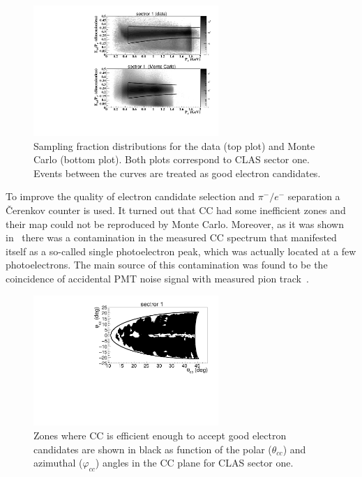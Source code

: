 \documentclass[prc,twocolumn,superscriptaddress,showpacs,amssymb,amsmath,amsfonts,linenumbers,aps]{revtex4-1}
\begin{document}
\begin{figure}[htp]
\begin{center}
 \includegraphics[width=7cm,keepaspectratio]{pictures/electron_id/ec_cut.pdf}
\vspace{-0.1cm}
\caption{Sampling fraction distributions for the data (top plot) and Monte Carlo (bottom plot). Both plots correspond to CLAS sector one. Events between the curves are treated as good electron candidates.}
\label{fig:ec_cut}
\end{center}
\end{figure} 


To improve the quality of electron candidate selection and $\pi^{-}/e^{-}$ separation a \v Cerenkov counter is used.
It turned out that CC had some inefficient zones  and their map could not be reproduced by Monte Carlo. Moreover, as it was shown in~\cite{Osipenko:2004} there was a contamination in the measured CC spectrum that manifested itself as a so-called single photoelectron peak, which was actually located at a few photoelectrons. The main source of this contamination was found to be the coincidence of accidental PMT noise signal with measured pion track~\cite{Osipenko:2004}. 

\begin{figure}[htp]
\begin{center}

\includegraphics[width=7cm,keepaspectratio]{pictures/electron_id/ph_vs_ph_cc.pdf}
\vspace{-0.1cm}
\caption{Zones where CC is efficient enough to accept good electron candidates are shown in black as function of the polar ($\theta_{cc}$) and azimuthal ($\varphi_{cc}$) angles in the CC plane for CLAS sector one. }
\label{fig:ph_vs_ph_cc}
\end{center}
\end{figure} 
\end{document}
